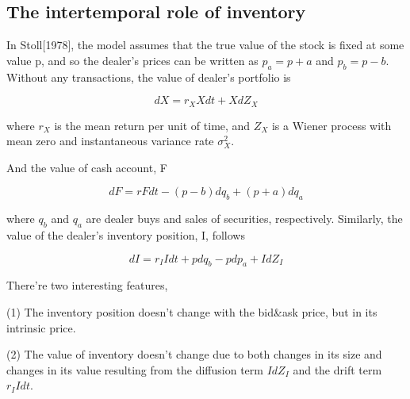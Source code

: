 \documentclass[a4]{article}
\begin{document}
\subsection{The intertemporal role of inventory}
In Stoll[1978], the model assumes that the true value of the stock is fixed at some value p, and so the dealer's prices can be written as $p_{a}=p+a$ and $p_{b}=p-b$. Without any transactions, the value of dealer's portfolio is \par 
\begin{equation}
dX = r_{X}Xdt + XdZ_{X}
\end{equation}\par 
where $r_{X}$ is the mean return per unit of time, and $Z_{X}$ is a Wiener process with mean zero and instantaneous variance rate $\sigma^{2}_{X}$.\par 
And the value of cash account, F\par 
\begin{equation}
dF = rFdt - (p-b)dq_{b} + (p+a)dq_{a}
\end{equation}\par 
where $q_{b}$ and $q_{a}$ are dealer buys and sales of securities, respectively. Similarly, the value of the dealer's inventory position, I, follows\par 
\begin{equation}
dI = r_{I}Idt + pdq_{b} - pdp_{a}+IdZ_{I}
\end{equation}\par 
\noindent There're two interesting features, \par 
\bigbreak 
(1) The inventory position doesn't change with the bid\&ask price, but in its intrinsic price.\par 
(2) The value of inventory doesn't change due to both changes in its size and changes in its value resulting from the diffusion term $IdZ_{I}$ and the drift term $r_{I}Idt$.
\end{document}
